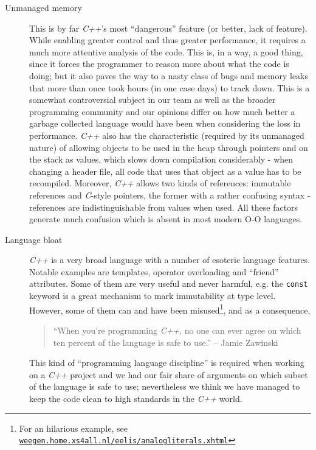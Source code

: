 \documentclass[a4paper,11pt,titlepage]{article}
\let\stdhref\href
\renewcommand{\href}[2]{\stdhref{#1}{\texttt{#2}}}
\newcommand{\code}[1]{\texttt{#1}}
\newcommand{\buzz}[1]{\emph{#1}}
\newcommand{\myhref}[1]{\href{http://#1}{#1}}
\begin{document}
\begin{description}

\item [Unmanaged memory] This is by far \buzz{C++}'s most
  ``dangerous'' feature (or better, lack of feature). While enabling
  greater control and thus greater performance, it requires a much
  more attentive analysis of the code. This is, in a way, a good
  thing, since it forces the programmer to reason more about what the
  code is doing; but it also paves the way to a nasty class of bugs
  and memory leaks that more than once took hours (in one case days)
  to track down. This is a somewhat controversial subject in our team
  as well as the broader programming community and our opinions differ
  on how much better a garbage collected language would have been when
  considering the loss in performance. \buzz{C++} also has the
  characteristic (required by its unmanaged nature) of allowing
  objects to be used in the heap through pointers and on the stack as
  values, which slows down compilation considerably - when changing a
  header file, all code that uses that object as a value has to be
  recompiled. Moreover, \buzz{C++} allows two kinds of references:
  immutable references and \buzz{C}-style pointers, the former with a
  rather confusing syntax - references are indistinguishable from
  values when used. All these factors generate much confusion which is
  absent in most modern O-O languages.

\item [Language bloat] \buzz{C++} is a very broad language with a
  number of esoteric language features. Notable examples are
  templates, operator overloading and ``friend'' attributes. Some of
  them are very useful and never harmful, e.g. the \code{const}
  keyword is a great mechanism to mark immutability at type
  level. However, some of them can and have been misused\footnote{For
    an hilarious example, see
    \myhref{weegen.home.xs4all.nl/eelis/analogliterals.xhtml}},
  and as a consequence,
  \begin{quote}
    ``When you're programming \buzz{C++}, no one can ever agree on
    which ten percent of the language is safe to use.'' -- Jamie
    Zawinski
  \end{quote}
  This kind of ``programming language discipline''
  is required when working on a \buzz{C++} project and we had our fair
  share of arguments on which subset of the language is safe to use;
  nevertheless we think we have managed to keep the code clean to high
  standards in the \buzz{C++} world.

\end{description}
\end{document}
